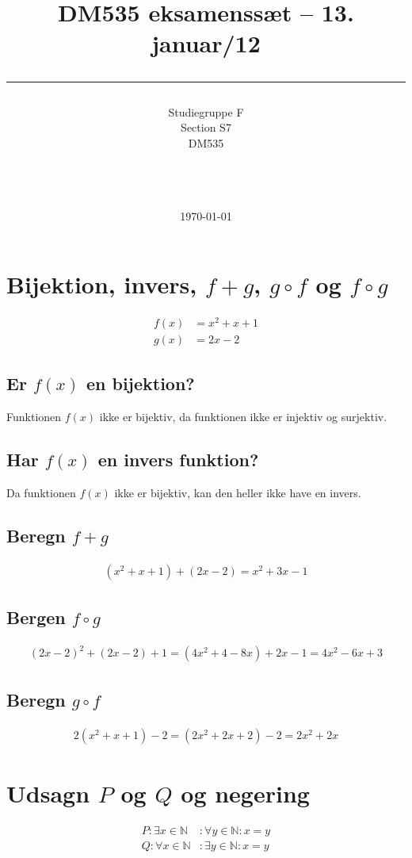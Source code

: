\documentclass[a4paper,10pt]{article}
\title{DM535 eksamenssæt -- 13. januar/12 \\ \rule{10cm}{0.5mm}}
\author{Studiegruppe F \\ Section S7 \\
DM535\\\rule{5.5cm}{0.5mm}\\}
\date{\today}
\newcommand{\N}{\mathbb{N}}
\begin{document}
\maketitle

\vfill

\tableofcontents

\newpage

\section{Bijektion, invers, $f+g$, $g \circ f$ og $f \circ g$}
\begin{align*}
f(x) &= x^2	+x+1\\
g(x) &= 2x-2
\end{align*}
\subsection*{Er $f(x)$ en bijektion?}
Funktionen $f(x)$ ikke er bijektiv, da funktionen ikke er injektiv og surjektiv.
\subsection*{Har $f(x)$ en invers funktion?}
Da funktionen $f(x)$ ikke er bijektiv, kan den heller ikke have en invers.
\subsection*{Beregn $f+g$}
\begin{align*}
(x^2+x+1)+(2x-2) = x^2+3x-1
\end{align*}
\subsection*{Bergen $f\circ g$}
\begin{align*}
(2x-2)^2+(2x-2)+1 = (4x^2+4-8x)+2x-1 = 4x^2-6x+3
\end{align*}
\subsection*{Beregn $g \circ f$}
\begin{align*}
2(x^2+x+1)-2 = (2x^2+2x+2)-2 = 2x^2+2x 
\end{align*}
\section{Udsagn $P$ og $Q$ og negering}
\begin{align*}
P:\exists x \in \N &: \forall y \in \N: x=y\\
Q:\forall x \in \N &: \exists y \in \N: x=y
\end{align*}
\end{document}
